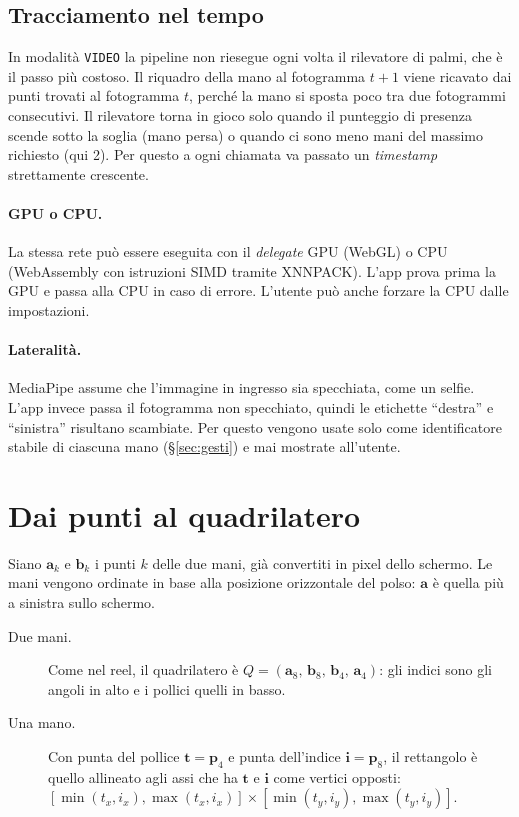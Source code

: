 \documentclass[11pt,a4paper]{article}
\newcommand{\vect}[1]{\mathbf{#1}}
\begin{document}
\subsection{Tracciamento nel tempo}
In modalità \texttt{VIDEO} la pipeline non riesegue ogni volta il rilevatore di palmi, che è il
passo più costoso. Il riquadro della mano al fotogramma $t+1$ viene ricavato dai punti trovati
al fotogramma $t$, perché la mano si sposta poco tra due fotogrammi consecutivi. Il rilevatore
torna in gioco solo quando il punteggio di presenza scende sotto la soglia (mano persa) o quando
ci sono meno mani del massimo richiesto (qui 2). Per questo a ogni chiamata va passato un
\emph{timestamp} strettamente crescente.

\paragraph{GPU o CPU.} La stessa rete può essere eseguita con il \emph{delegate} GPU (WebGL) o
CPU (WebAssembly con istruzioni SIMD tramite XNNPACK). L'app prova prima la GPU e passa alla
CPU in caso di errore. L'utente può anche forzare la CPU dalle impostazioni.

\paragraph{Lateralità.} MediaPipe assume che l'immagine in ingresso sia specchiata, come un
selfie. L'app invece passa il fotogramma non specchiato, quindi le etichette ``destra'' e
``sinistra'' risultano scambiate. Per questo vengono usate solo come identificatore stabile di
ciascuna mano (\S\ref{sec:gesti}) e mai mostrate all'utente.

\section{Dai punti al quadrilatero}

Siano $\vect{a}_k$ e $\vect{b}_k$ i punti $k$ delle due mani, già convertiti in pixel dello
schermo. Le mani vengono ordinate in base alla posizione orizzontale del polso: $\vect{a}$ è
quella più a sinistra sullo schermo.

\begin{description}
  \item[Due mani.] Come nel reel, il quadrilatero è
  $Q=(\vect{a}_8,\,\vect{b}_8,\,\vect{b}_4,\,\vect{a}_4)$: gli indici sono gli angoli in alto e i
  pollici quelli in basso.
  \item[Una mano.] Con punta del pollice $\vect{t}=\vect{p}_4$ e punta dell'indice
  $\vect{i}=\vect{p}_8$, il rettangolo è quello allineato agli assi che ha $\vect{t}$ e $\vect{i}$
  come vertici opposti: $[\min(t_x,i_x),\max(t_x,i_x)]\times[\min(t_y,i_y),\max(t_y,i_y)]$.
\end{description}
\end{document}
